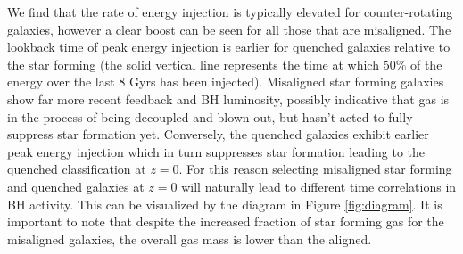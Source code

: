 \documentclass[fleqn,usenatbib]{mnras}
\begin{document}
We find that the rate of energy injection is typically elevated for counter-rotating galaxies, however a clear boost can be seen for all those that are misaligned. The lookback time of peak energy injection is earlier for quenched galaxies relative to the star forming (the solid vertical line represents the time at which 50\% of the energy over the last 8 Gyrs has been injected).  Misaligned star forming galaxies show far more recent feedback and BH luminosity, possibly indicative that gas is in the process of being decoupled and blown out, but hasn't acted to fully suppress star formation yet. Conversely, the quenched galaxies exhibit earlier peak energy injection which in turn suppresses star formation leading to the quenched classification at $z=0$. For this reason selecting misaligned star forming and quenched galaxies at $z=0$ will naturally lead to different time correlations in BH activity. This can be visualized by the diagram in Figure \ref{fig:diagram}. It is important to note that despite the increased fraction of star forming gas for the misaligned galaxies, the overall gas mass is lower than the aligned.

\end{document}
